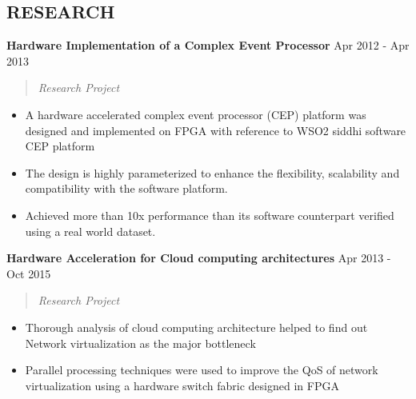 \documentclass[mm]{res} %
\begin{document}
\begin{resume}

\vspace {2 mm}
\section{RESEARCH} 

\textbf{Hardware Implementation of a Complex Event Processor} \hfill Apr 2012 - Apr 2013
\begin{quote}
	\emph{Research Project}
\end{quote}

\begin{itemize} \itemsep -1pt %
	\item A hardware accelerated complex event processor (CEP) platform was designed and implemented on FPGA with reference to WSO2 siddhi software CEP platform
	\item The design is highly parameterized to enhance the flexibility, scalability and compatibility with the software platform.
	\item Achieved more than 10x performance than its software counterpart verified using a real world dataset.
\end{itemize}

\textbf{Hardware Acceleration for Cloud computing architectures} \hfill Apr 2013 - Oct 2015
\begin{quote}
\emph{Research Project}
\end{quote}

\begin{itemize} \itemsep -1pt %
\item Thorough analysis of cloud computing architecture helped to find out Network virtualization as the major bottleneck
\item Parallel processing techniques were used to improve the QoS of network virtualization using a hardware switch fabric designed in FPGA
\end{itemize}


\end{resume}
\end{document}
